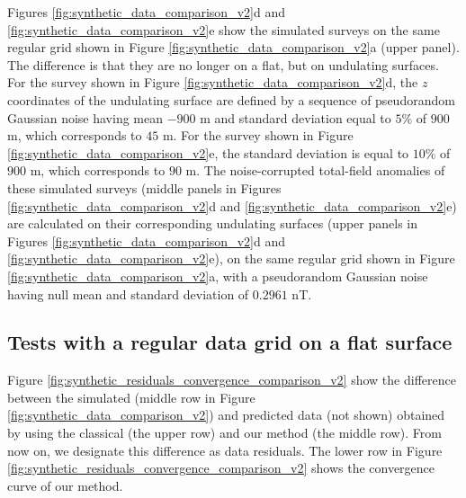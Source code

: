 \documentclass[manuscript]{geophysics}
\begin{document}
	
	Figures \ref{fig:synthetic_data_comparison_v2}d and \ref{fig:synthetic_data_comparison_v2}e 
	show the simulated surveys on the same regular grid shown in Figure 
	\ref{fig:synthetic_data_comparison_v2}a (upper panel). The difference is that 
	they are no longer on a flat, but on undulating surfaces.
	For the survey shown in Figure \ref{fig:synthetic_data_comparison_v2}d, the $z$ coordinates 
	of the undulating surface are defined by a sequence of pseudorandom Gaussian noise having mean 
	$-900$ m and standard deviation equal to $5\%$ of $900$ m, which corresponds to $45$ m.
	For the survey shown in Figure \ref{fig:synthetic_data_comparison_v2}e, the standard deviation 
	is equal to $10\%$ of $900$ m, which corresponds to $90$ m.
	The noise-corrupted total-field anomalies of these simulated surveys (middle panels in Figures 
	\ref{fig:synthetic_data_comparison_v2}d and \ref{fig:synthetic_data_comparison_v2}e) are calculated 
	on their corresponding undulating surfaces (upper panels in Figures 
	\ref{fig:synthetic_data_comparison_v2}d and \ref{fig:synthetic_data_comparison_v2}e),
	on the same regular grid shown in Figure \ref{fig:synthetic_data_comparison_v2}a,
	with a pseudorandom Gaussian noise having null mean and standard deviation of $0.2961$ nT.
	
	
	\subsection*{Tests with a regular data grid on a flat surface}
	
	Figure \ref{fig:synthetic_residuals_convergence_comparison_v2} show the 
	difference between the simulated (middle row in Figure \ref{fig:synthetic_data_comparison_v2})
	and predicted data (not shown) obtained by using the classical (the upper row) and 
	our method (the middle row). From now on, we designate this difference as data residuals. 
	The lower row in Figure \ref{fig:synthetic_residuals_convergence_comparison_v2} shows the 
	convergence curve of our method.
	
\end{document}
